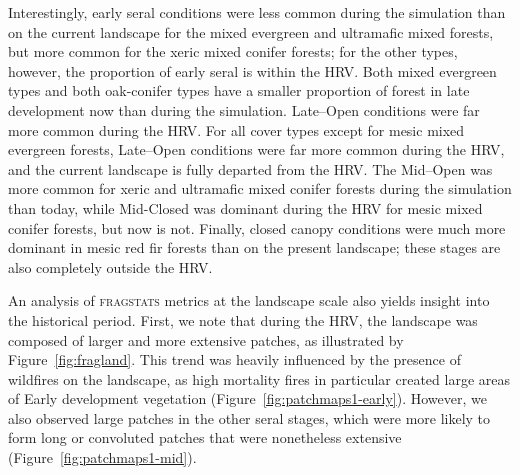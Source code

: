 Interestingly, early seral conditions were less common during the simulation than on the current landscape for the mixed evergreen and ultramafic mixed forests, but more common for the xeric mixed conifer forests; for the other types, however, the proportion of early seral is within the HRV. Both mixed evergreen types and both oak-conifer types have a smaller proportion of forest in late development now than during the simulation. Late--Open conditions were far more common during the HRV. For all cover types except for mesic mixed evergreen forests, Late--Open conditions were far more common during the HRV, and the current landscape is fully departed from the HRV. The Mid--Open was more common for xeric and ultramafic mixed conifer forests during the simulation than today, while Mid-Closed was dominant during the HRV for mesic mixed conifer forests, but now is not. Finally, closed canopy conditions were much more dominant in mesic red fir forests than on the present landscape; these stages are also completely outside the HRV.


An analysis of \textsc{fragstats} metrics at the landscape scale also yields insight into the historical period. First, we note that during the HRV, the landscape was composed of larger and more extensive patches, as illustrated by Figure~\ref{fig:fragland}. This trend was heavily influenced by the presence of wildfires on the landscape, as high mortality fires in particular created large areas of Early development vegetation (Figure~\ref{fig:patchmaps1-early}). However, we also observed large patches in the other seral stages, which were more likely to form long or convoluted patches that were nonetheless extensive (Figure~\ref{fig:patchmaps1-mid}).


